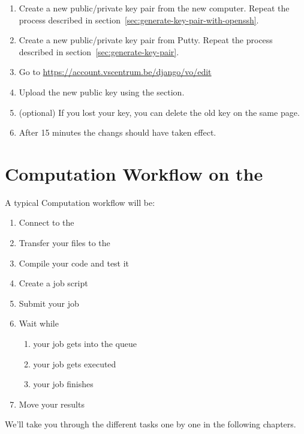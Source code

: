 \begin{enumerate}
\ifmacORlinux
 \item Create a new public/private key pair from the new computer. Repeat the process described in section~\ref{sec:generate-key-pair-with-openssh}.
\fi %
\ifwindows
 \item Create a new public/private key pair from Putty. Repeat the process described in section~\ref{sec:generate-key-pair}.
\fi %
 \item Go to \url{https://account.vscentrum.be/django/vo/edit}
 \item Upload the new public key using the  section.
 \item (optional) If you lost your key, you can delete the old key on the same page.
 \item After 15 minutes the changs should have taken effect.
\end{enumerate}

\section{Computation Workflow on the \hpc}
\label{sec:compuation-workflow-on-the-hpc}

A typical Computation workflow will be:

\begin{enumerate}
  \item  Connect to the \hpc
  \item  Transfer your files to the \hpc
  \item  Compile your code and test it
  \item  Create a job script
  \item  Submit your job
  \item  Wait while
  \begin{enumerate}
    \item  your job gets into the queue
    \item  your job gets executed
    \item  your job finishes
  \end{enumerate}
  \item  Move your results
\end{enumerate}

We'll take you through the different tasks one by one in the following
chapters.
